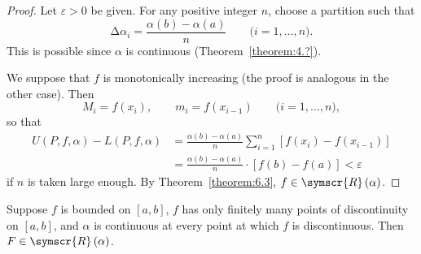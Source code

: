 \begin{proof}
    Let \(\varepsilon>0\) be given. For any positive integer \(n\), choose a partition such that
    \begin{equation*}
        \increment\alpha_i=\frac{\alpha\left(b\right)-\alpha\left(a\right)}{n}\qquad\text{(\(i=1,\ldots,n\))}.
    \end{equation*}
    This is possible since \(\alpha\) is continuous (Theorem~\ref{theorem:4.?}).

    We suppose that \(f\) is monotonically increasing (the proof is analogous in the other case). Then
    \begin{equation*}
        M_i=f\left(x_i\right),\qquad m_i=f\left(x_{i-1}\right)\qquad\text{(\(i=1,\ldots,n\))},
    \end{equation*}
    so that
    \begin{align*}
        U\left(P,f,\alpha\right)-L\left(P,f,\alpha\right)&=\frac{\alpha\left(b\right)-\alpha\left(a\right)}{n}\sum_{i=1}^n\left[f\left(x_i\right)-f\left(x_{i-1}\right)\right]\\
        &=\frac{\alpha\left(b\right)-\alpha\left(a\right)}{n}\cdot\left[f\left(b\right)-f\left(a\right)\right]<\varepsilon
    \end{align*}
    if \(n\) is taken large enough. By Theorem~\ref{theorem:6.3}, \(f\in\symscr{R}\left(\alpha\right)\).
\end{proof}

\begin{theorem}
    Suppose \(f\) is bounded on \(\left[a,b\right]\), \(f\) has only finitely many points of discontinuity on \(\left[a,b\right]\), and \(\alpha\) is continuous at every point at which \(f\) is discontinuous. Then \(F\in\symscr{R}\left(\alpha\right)\).
\end{theorem}


